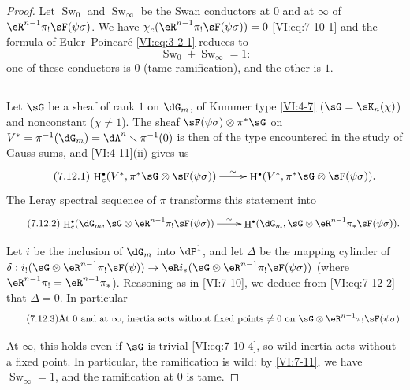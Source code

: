 \documentclass[oneside]{book}
\DeclareMathOperator{\h}{H}
\DeclareMathOperator{\swan}{Sw}
\renewcommand{\setminus}{\smallsetminus}
\theoremstyle{sga-source}
\theoremstyle{sga-source-dash}
\theoremstyle{sga-source-dotdash}
\theoremstyle{sga-source-number-note-dash}
\theoremstyle{sga-source-note-number-dotdash}
\theoremstyle{sga-source-example-dotdash}
\theoremstyle{sga-source-inline-number}
\theoremstyle{sga-source-bare-number}
\theoremstyle{sga-source}
\let\oldbullet\bullet
\renewcommand{\bullet}{\textnormal{\tiny$\oldbullet$}}
\begin{document}
\begin{proof}[Proof]
Let $\swan_0$ and $\swan_\infty$ be the Swan conductors at $0$ and at 
$\infty$ of $\eR^{n-1} \pi_! \sF(\psi\sigma)$. We have 
$\chi_c(\eR^{n-1} \pi_! \sF(\psi\sigma))=0$ \eqref{VI:eq:7-10-1} and the formula 
of Euler--Poincaré \eqref{VI:eq:3-2-1} reduces to 
\begin{equation*}\tag{7.11.1}\label{VI:eq:7-11-1}
  \swan_0 + \swan_\infty =1 \text{:} 
\end{equation*}
one of these conductors is $0$ (tame ramification), and the other is $1$. 





\subsection{}\label{VI:7-12}

Let $\sG$ be a sheaf of rank $1$ on $\dG_m$, of Kummer type 
\ref{VI:4-7} ($\sG=\sK_n(\chi)$) and nonconstant ($\chi\ne 1$). The sheaf 
$\sF(\psi\sigma)\otimes \pi^\ast \sG$ on 
$V^\ast=\pi^{-1}(\dG_m) = \dA^n\setminus \pi^{-1}(0)$ is then of the type 
encountered in the study of Gauss sums, and \ref{VI:4-11}(ii) gives us 
\begin{equation*}\tag{7.12.1}\label{VI:eq:7-12-1}
\xymatrix{
  \h_c^\bullet(V^\ast,\pi^\ast\sG\otimes \sF(\psi\sigma)) \ar[r]^-\sim 
    & \h^\bullet(V^\ast,\pi^\ast \sG\otimes \sF(\psi\sigma)) \text{.} 
}
\end{equation*}
The Leray spectral sequence of $\pi$ transforms this statement into 
\begin{equation*}\tag{7.12.2}\label{VI:eq:7-12-2}
\xymatrix{
  \h_c^\bullet(\dG_m,\sG\otimes \eR^{n-1} \pi_! \sF(\psi\sigma)) \ar[r]^-\sim 
    & \h^\bullet(\dG_m,\sG\otimes \eR^{n-1} \pi_\ast \sF(\psi\sigma)) \text{.} 
}
\end{equation*}

Let $i$ be the inclusion of $\dG_m$ into $\dP^1$, and let $\Delta$ be the mapping cylinder 
of 
  $\delta:i_!(\sG\otimes \eR^{n-1}\pi_! \sF(\psi))\to \eR i_\ast (\sG\otimes \eR^{n-1} \pi_! \sF(\psi\sigma))$
(where $\eR^{n-1} \pi_! = \eR^{n-1}\pi_\ast$). Reasoning as in 
\ref{VI:7-10}, we deduce from \eqref{VI:eq:7-12-2} that $\Delta=0$. In 
particular 
\begin{equation*}\tag{7.12.3}\label{VI:eq:7-12-3}
  \text{At $0$ and at $\infty$, inertia acts without fixed points $\ne 0$ on $\sG\otimes \eR^{n-1}\pi_! \sF(\psi\sigma)$.}
\end{equation*}

At $\infty$, this holds even if $\sG$ is trivial \eqref{VI:eq:7-10-4}, 
so wild inertia acts without a fixed point. In particular, the 
ramification is wild: by \ref{VI:7-11}, we have $\swan_\infty=1$, and the 
ramification at $0$ is tame. 


\end{proof}
\end{document}
